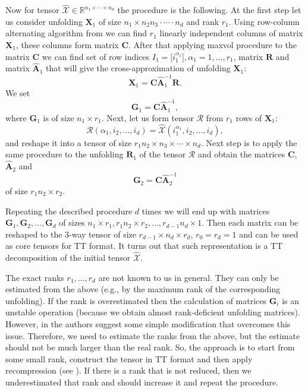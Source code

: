 Now for tensor $\widehat{\mathcal{X}} \in \mathbb{R}^{n_1 \times \cdots \times n_d}$ the procedure is the following.
At the first step let us consider unfolding $\mathbf{X}_1$ of size
$n_1 \times n_2 n_3 \cdot \cdots \cdot n_d$ and rank $r_1$.
Using row-column alternating algorithm from \citep{tyrtyshnikov2000incomplete} we can find $r_1$ linearly independent columns of matrix $\mathbf{X}_1$, these columns form matrix $\mathbf{C}$.
After that applying maxvol procedure \citep{tyrtyshnikov2000incomplete} to the matrix $\mathbf{C}$ we can find set of row indices $I_1 = \big[i_1^{\alpha_1} \big], \alpha_1 = 1, \ldots, r_1$, matrix $\mathbf{R}$ and matrix $\widehat{\mathbf{A}}_1$
that will give the cross-approximation of unfolding $\mathbf{X}_1$:
\[
    \mathbf{X}_1 = \mathbf{C}\widehat{\mathbf{A}}_1^{-1}\mathbf{R}.
\]
We set
\[
    \mathbf{G}_1 = \mathbf{C}\widehat{\mathbf{A}}_1^{-1},
\]
where $\mathbf{G}_1$ is of size $n_1 \times r_1$.
Next, let us form tensor $\mathcal{R}$ from $r_1$ rows of $\mathbf{X}_1$:
\[
    \mathcal{R}(\alpha_1, i_2, \ldots, i_d) = \widehat{\mathcal{X}}(i_1^{\alpha_1}, i_2, \ldots, i_d),
\]
and reshape it into a tensor of size $r_1n_2 \times n_3 \times \cdots \times n_d$.
Next step is to apply the same procedure to the unfolding $\mathbf{R}_1$ of the tensor $\mathcal{R}$ and obtain the matrices $\mathbf{C}$, $\widehat{\mathbf{A}}_2$ and
\[
    \mathbf{G}_2 = \mathbf{C} \widehat{\mathbf{A}}_2^{-1}
\]
of size $r_1n_2 \times r_2$.

Repeating the described procedure $d$ times we will end up with matrices
$\mathbf{G}_1, \allowbreak \mathbf{G}_2, \ldots, \mathbf{G}_d$ of sizes $n_1 \times r_1, r_1n_2 \times r_2, \ldots, r_{d-1}n_d \times 1$.
Then each matrix can be reshaped to the $3$-way tensor of size $r_{d - 1} \times n_d \times r_d$,
$r_0 = r_d = 1$ and can be used as core tensors for TT format.
It turns out that such representation is a TT decomposition of the initial tensor $\widehat{\mathcal{X}}$.

The exact ranks $r_1, \ldots, r_d$ are not known to us in general.
They can only be estimated from the above (e.g., by the maximum rank of the corresponding unfolding).
If the rank is overestimated then the calculation of matrices $\mathbf{G}_i$
is an unstable operation (because we obtain almost rank-deficient unfolding matrices).
However, in \citep{oseledets2010tt} the authors suggest some simple modification that overcomes this issue.
Therefore, we need to estimate the ranks from the above, but
the estimate should not be much larger than the real rank.
So, the approach is to start from some small rank, construct the tensor
in TT format and then apply recompression (see \citep{oseledets2011tensor}).
If there is a rank that is not reduced, then we underestimated that rank and should increase it and repeat the procedure.

